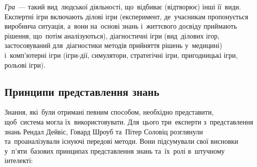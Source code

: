 \documentclass[
  a4paper,
  oneside,
  BCOR = 10mm,
  DIV = 12,
  12pt,
  headings = normal,
]{scrartcl}
\begin{document}
\begin{hangenumerate}[leftmargin=0em]
\begin{hangenumerate}[leftmargin=0em]
\begin{hangenumerate}
\begin{hangenumerate}
                    \item \emph{Гра}~— такий вид~людської діяльності, що~відбиває (відтворює) інші її~види. Експертні ігри включають ділові ігри (експеримент, де~учасникам пропонується виробнича ситуація, а~вони на~основі знань і~життєвого досвіду приймають рішення, що~потім аналізуються), діагностичні ігри (вид~ділових ігор, застосовуваний для~діагностики методів прийняття рішень у~медицині) і~комп'ютерні ігри (ігри-дії, симулятори, стратегічні ігри, пригодницькі ігри, рольові ігри).
                  \end{hangenumerate}
              \end{hangenumerate}
          \end{hangenumerate}
      \end{hangenumerate}

    \subsection{Принципи представлення знань}
      Знання, які~були отримані певним способом, необхідно представити, щоб~система могла їх~використовувати. Для~цього три~експерти з~представлення знань Рендал Дейвіс, Говард Шроуб та~Пітер Соловіц розглянули та~проаналізували існуючі передові методи. Вони підсумували свої висновки у~п'яти~базових принципах представлення знань та~їх~ролі в~штучному інтелекті:
\end{document}
